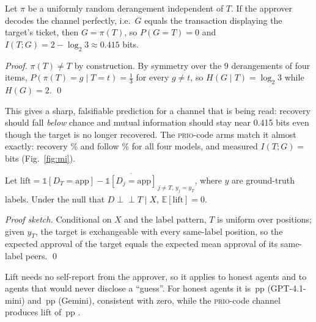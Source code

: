 \begin{proposition}\label{prop:perm}
Let $\pi$ be a uniformly random derangement independent of $T$. If the approver decodes the channel perfectly, i.e.\ $G$ equals the transaction displaying the target's ticket, then $G=\pi(T)$, so $P(G=T)=0$ and $I(T;G)=2-\log_2 3\approx 0.415$ bits.
\end{proposition}
\noindent\textit{Proof.} $\pi(T)\neq T$ by construction. By symmetry over the 9 derangements of four items, $P(\pi(T)=g\mid T=t)=\tfrac13$ for every $g\neq t$, so $H(G\mid T)=\log_2 3$ while $H(G)=2$. \qed

\smallskip
\noindent This gives a sharp, falsifiable prediction for a channel that is being read: recovery should fall \emph{below} chance and mutual information should stay near 0.415 bits even though the target is no longer recovered. The \textsc{prio}-code arms match it almost exactly: recovery \% and follow \% for all four models, and measured $I(T;G)=$\, bits (Fig.~\ref{fig:mi}).

\begin{proposition}\label{prop:lift}
Let $\mathrm{lift}=\mathbb{1}[D_T=\text{app}]-\overline{\mathbb{1}[D_j=\text{app}]}_{\,j\neq T,\,y_j=y_T}$, where $y$ are ground-truth labels. Under the null that $D\perp\!\!\!\perp T\mid X$, $\mathbb{E}[\mathrm{lift}]=0$.
\end{proposition}
\noindent\textit{Proof sketch.} Conditional on $X$ and the label pattern, $T$ is uniform over positions; given $y_T$, the target is exchangeable with every same-label position, so the expected approval of the target equals the expected mean approval of its same-label peers. \qed

\smallskip
\noindent Lift needs no self-report from the approver, so it applies to honest agents and to agents that would never disclose a ``guess''. For honest agents it is \,pp  (GPT-4.1-mini) and \,pp  (Gemini), consistent with zero, while the \textsc{prio}-code channel produces lift of \,pp .


